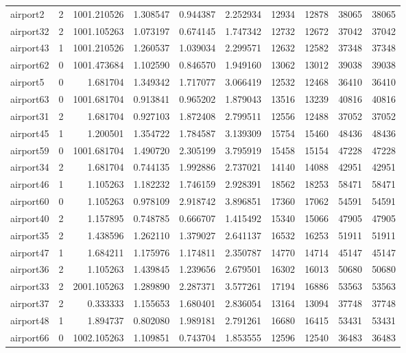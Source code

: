 \begin{longtable}{|l|r|r|r|r|r|r|r|r|r|}
airport2 & 2 & 1001.210526 & 1.308547 & 0.944387 & 2.252934 & 12934 & 12878 & 38065 & 38065 \\
airport32 & 2 & 1001.105263 & 1.073197 & 0.674145 & 1.747342 & 12732 & 12672 & 37042 & 37042 \\
airport43 & 1 & 1001.210526 & 1.260537 & 1.039034 & 2.299571 & 12632 & 12582 & 37348 & 37348 \\
airport62 & 0 & 1001.473684 & 1.102590 & 0.846570 & 1.949160 & 13062 & 13012 & 39038 & 39038 \\
airport5 & 0 & 1.681704 & 1.349342 & 1.717077 & 3.066419 & 12532 & 12468 & 36410 & 36410 \\
airport63 & 0 & 1001.681704 & 0.913841 & 0.965202 & 1.879043 & 13516 & 13239 & 40816 & 40816 \\
airport31 & 2 & 1.681704 & 0.927103 & 1.872408 & 2.799511 & 12556 & 12488 & 37052 & 37052 \\
airport45 & 1 & 1.200501 & 1.354722 & 1.784587 & 3.139309 & 15754 & 15460 & 48436 & 48436 \\
airport59 & 0 & 1001.681704 & 1.490720 & 2.305199 & 3.795919 & 15458 & 15154 & 47228 & 47228 \\
airport34 & 2 & 1.681704 & 0.744135 & 1.992886 & 2.737021 & 14140 & 14088 & 42951 & 42951 \\
airport46 & 1 & 1.105263 & 1.182232 & 1.746159 & 2.928391 & 18562 & 18253 & 58471 & 58471 \\
airport60 & 0 & 1.105263 & 0.978109 & 2.918742 & 3.896851 & 17360 & 17062 & 54591 & 54591 \\
airport40 & 2 & 1.157895 & 0.748785 & 0.666707 & 1.415492 & 15340 & 15066 & 47905 & 47905 \\
airport35 & 2 & 1.438596 & 1.262110 & 1.379027 & 2.641137 & 16532 & 16253 & 51911 & 51911 \\
airport47 & 1 & 1.684211 & 1.175976 & 1.174811 & 2.350787 & 14770 & 14714 & 45147 & 45147 \\
airport36 & 2 & 1.105263 & 1.439845 & 1.239656 & 2.679501 & 16302 & 16013 & 50680 & 50680 \\
airport33 & 2 & 2001.105263 & 1.289890 & 2.287371 & 3.577261 & 17194 & 16886 & 53563 & 53563 \\
airport37 & 2 & 0.333333 & 1.155653 & 1.680401 & 2.836054 & 13164 & 13094 & 37748 & 37748 \\
airport48 & 1 & 1.894737 & 0.802080 & 1.989181 & 2.791261 & 16680 & 16415 & 53431 & 53431 \\
airport66 & 0 & 1002.105263 & 1.109851 & 0.743704 & 1.853555 & 12596 & 12540 & 36483 & 36483 \\

\end{longtable}
